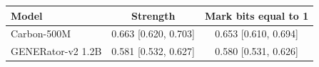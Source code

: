 \begin{tabular}{@{}l c c@{}}
\toprule
Model & Strength & Mark bits equal to 1 \\
\midrule
Carbon-500M & 0.663 [0.620, 0.703] & 0.653 [0.610, 0.694] \\
GENERator-v2 1.2B & 0.581 [0.532, 0.627] & 0.580 [0.531, 0.626] \\
\bottomrule
\end{tabular}
